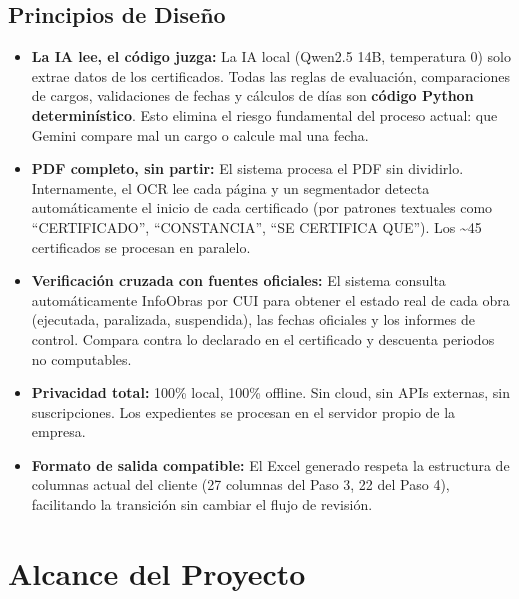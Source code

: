\documentclass[11pt,a4paper]{article}
\begin{document}
\subsection{Principios de Diseño}
\begin{itemize}[leftmargin=*]
    \item \textbf{La IA lee, el código juzga:} La IA local (Qwen2.5 14B, temperatura 0) solo extrae datos de los certificados. Todas las reglas de evaluación, comparaciones de cargos, validaciones de fechas y cálculos de días son \textbf{código Python determinístico}. Esto elimina el riesgo fundamental del proceso actual: que Gemini compare mal un cargo o calcule mal una fecha.
    
    \item \textbf{PDF completo, sin partir:} El sistema procesa el PDF sin dividirlo. Internamente, el OCR lee cada página y un segmentador detecta automáticamente el inicio de cada certificado (por patrones textuales como ``CERTIFICADO'', ``CONSTANCIA'', ``SE CERTIFICA QUE''). Los \textasciitilde45 certificados se procesan en paralelo.
    
    \item \textbf{Verificación cruzada con fuentes oficiales:} El sistema consulta automáticamente InfoObras por CUI para obtener el estado real de cada obra (ejecutada, paralizada, suspendida), las fechas oficiales y los informes de control. Compara contra lo declarado en el certificado y descuenta periodos no computables.
    
    \item \textbf{Privacidad total:} 100\% local, 100\% offline. Sin cloud, sin APIs externas, sin suscripciones. Los expedientes se procesan en el servidor propio de la empresa.
    
    \item \textbf{Formato de salida compatible:} El Excel generado respeta la estructura de columnas actual del cliente (27 columnas del Paso 3, 22 del Paso 4), facilitando la transición sin cambiar el flujo de revisión.
\end{itemize}

\section{Alcance del Proyecto}
\end{document}

